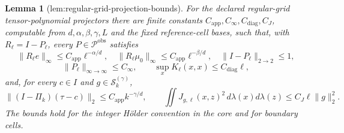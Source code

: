 \documentclass{article}
\newtheorem{lemma}{Lemma}
\begin{document}
\begin{lemma}[lem:regular-grid-projection-bounds]\label{lem:regular-grid-projection-bounds}
For the declared regular-grid tensor-polynomial projectors there are finite constants \(C_{\mathrm{app}},C_\infty,C_{\mathrm{diag}},C_J\), computable from \(d,\alpha,\beta,\gamma,L\) and the fixed reference-cell bases, such that, with \(R_\ell=I-P_\ell\), every \(P\in\mathcal P^{\mathrm{obs}}\) satisfies
\[
 \|R_\ell e\|_\infty\le C_{\mathrm{app}}\ell^{-\alpha/d},\quad
 \|R_\ell\mu_0\|_\infty\le C_{\mathrm{app}}\ell^{-\beta/d},\quad
 \|I-P_\ell\|_{2\to2}\le1,
\]
\[
 \|P_\ell\|_{\infty\to\infty}\le C_\infty,\qquad
 \sup_xK_\ell(x,x)\le C_{\mathrm{diag}}\ell,
\]
and, for every \(c\in I\) and \(g\in\mathcal S_k^{(\gamma)}\),
\[
 \|(I-\Pi_k)(\tau-c)\|_2\le C_{\mathrm{app}}k^{-\gamma/d},
 \qquad
 \iint J_{g,\ell}(x,z)^2\,d\lambda(x)d\lambda(z)
 \le C_J\ell\|g\|_2^2.
\]
The bounds hold for the integer Hölder convention in the core and for boundary cells.
\end{lemma}
\end{document}
